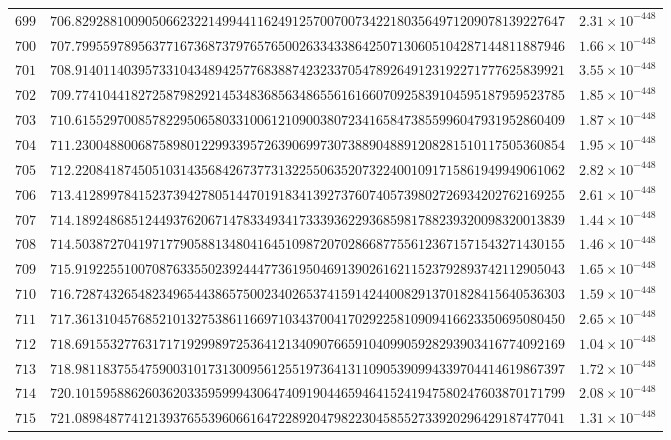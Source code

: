 \documentclass[12pt,reqno]{amsart}
\theoremstyle{remark}
\begin{document}
\begin{longtable}{clc}
$699$ & $706.8292881009050662322149944116249125700700734221803564971209078139227647$ & $2.31\times 10^{-448}$ \\
$700$ & $707.7995597895637716736873797657650026334338642507130605104287144811887946$ & $1.66\times 10^{-448}$ \\
$701$ & $708.9140114039573310434894257768388742323370547892649123192271777625839921$ & $3.55\times 10^{-448}$ \\
$702$ & $709.7741044182725879829214534836856348655616166070925839104595187959523785$ & $1.85\times 10^{-448}$ \\
$703$ & $710.6155297008578229506580331006121090038072341658473855996047931952860409$ & $1.87\times 10^{-448}$ \\
$704$ & $711.2300488006875898012299339572639069973073889048891208281510117505360854$ & $1.95\times 10^{-448}$ \\
$705$ & $712.2208418745051031435684267377313225506352073224001091715861949949061062$ & $2.82\times 10^{-448}$ \\
$706$ & $713.4128997841523739427805144701918341392737607405739802726934202762169255$ & $2.61\times 10^{-448}$ \\
$707$ & $714.1892486851244937620671478334934173339362293685981788239320098320013839$ & $1.44\times 10^{-448}$ \\
$708$ & $714.5038727041971779058813480416451098720702866877556123671571543271430155$ & $1.46\times 10^{-448}$ \\
$709$ & $715.9192255100708763355023924447736195046913902616211523792893742112905043$ & $1.65\times 10^{-448}$ \\
$710$ & $716.7287432654823496544386575002340265374159142440082913701828415640536303$ & $1.59\times 10^{-448}$ \\
$711$ & $717.3613104576852101327538611669710343700417029225810909416623350695080450$ & $2.65\times 10^{-448}$ \\
$712$ & $718.6915532776317171929989725364121340907665910409905928293903416774092169$ & $1.04\times 10^{-448}$ \\
$713$ & $718.9811837554759003101731300956125519736413110905390994339704414619867397$ & $1.72\times 10^{-448}$ \\
$714$ & $720.1015958862603620335959994306474091904465946415241947580247603870171799$ & $2.08\times 10^{-448}$ \\
$715$ & $721.0898487741213937655396066164722892047982230458552733920296429187477041$ & $1.31\times 10^{-448}$ \\

\end{longtable}
\end{document}
